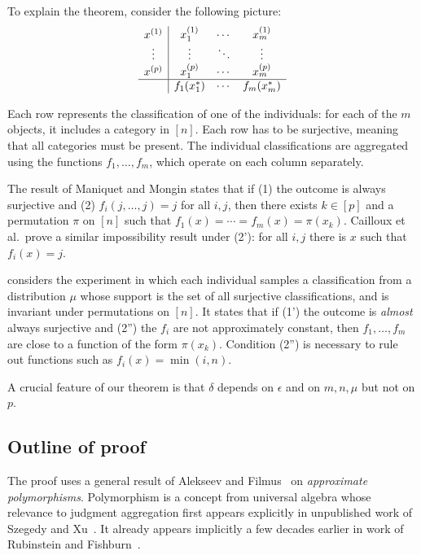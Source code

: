 \documentclass{article}
\theoremstyle{definition}
\theoremstyle{remark}
\begin{document}
To explain the theorem, consider the following picture:
\[
\begin{array}{c|ccc}
x^{(1)} & x^{(1)}_1 & \cdots & x^{(1)}_m \\
\vdots & \vdots & \ddots & \vdots \\
x^{(p)} & x^{(p)}_1 & \cdots & x^{(p)}_m \\\hline
& f_1(x^*_1) & \cdots & f_m(x^*_m)
\end{array}
\]

Each row represents the classification of one of the individuals: for each of the $m$ objects, it includes a category in $[n]$. Each row has to be surjective, meaning that all categories must be present. The individual classifications are aggregated using the functions $f_1,\dots,f_m$, which operate on each column separately.

The result of Maniquet and Mongin states that if (1) the outcome is always surjective and (2) $f_i(j,\dots,j) = j$ for all $i,j$, then there exists $k \in [p]$ and a permutation $\pi$ on $[n]$ such that $f_1(x) = \cdots = f_m(x) = \pi(x_k)$. Cailloux et al.\ prove a similar impossibility result under (2'): for all $i,j$ there is $x$ such that $f_i(x) = j$.

 considers the experiment in which each individual samples a classification from a distribution $\mu$ whose support is the set of all surjective classifications, and is invariant under permutations on $[n]$. It states that if (1') the outcome is \emph{almost} always surjective and (2'') the $f_i$ are not approximately constant, then $f_1,\dots,f_m$ are close to a function of the form $\pi(x_k)$. Condition (2'') is necessary to rule out functions such as $f_i(x) = \min(i,n)$.

A crucial feature of our theorem is that $\delta$ depends on $\epsilon$ and on $m,n,\mu$ but not on $p$.

\subsection{Outline of proof}
\label{sec:intro-outline}

The proof uses a general result of Alekseev and Filmus~\cite{AlekseevFilmus} on \emph{approximate polymorphisms}. Polymorphism is a concept from universal algebra whose relevance to judgment aggregation first appears explicitly in unpublished work of Szegedy and Xu~\cite{SzegedyXu15}. It already appears implicitly a few decades earlier in work of Rubinstein and Fishburn~\cite{RubinsteinFishburn}.
\end{document}

